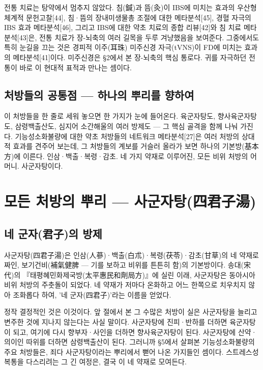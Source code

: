 \documentclass[12pt,oneside]{book}
\begin{document}
전통 치료는 탕약에서 멈추지 않았다. 침(鍼)과 뜸(灸)이 IBS에 미치는 효과의 우산형 체계적 문헌고찰[44], 침·뜸의 장내미생물총 조절에 대한 메타분석[45], 경혈 자극의 IBS 효과 메타분석[46], 그리고 IBS에 대한 약초 치료의 종합 리뷰[42]와 침 치료 메타분석[43]은, 전통 치료가 장-뇌축의 여러 길목을 두루 겨냥했음을 보여준다. 그중에서도 특히 눈길을 끄는 것은 경피적 이주(耳珠) 미주신경 자극(tVNS)이 FD에 미치는 효과의 메타분석[41]이다. 미주신경은 §2에서 본 장-뇌축의 핵심 통로다. 귀를 자극하던 전통이 바로 이 현대적 표적과 만나는 셈이다.

\subsection{처방들의 공통점 — 하나의 뿌리를 향하여}

이 처방들을 한 줄로 세워 놓으면 한 가지가 눈에 들어온다. 육군자탕도, 향사육군자탕도, 삼령백출산도, 심지어 소간해울의 여러 방제도 — 그 핵심 골격을 함께 나눠 가진다. 기능성소화불량에 대한 약초 처방들의 네트워크 메타분석[27]은 여러 처방의 상대적 효과를 견주어 보는데, 그 처방들의 계보를 거슬러 올라가 보면 하나의 기본방(基本方)에 이른다. 인삼·백출·복령·감초. 네 가지 약재로 이루어진, 모든 비위 처방의 어머니. 사군자탕이다.

\section{모든 처방의 뿌리 — 사군자탕(四君子湯)}

\subsection{네 군자(君子)의 방제}

사군자탕(四君子湯)은 인삼(人蔘)·백출(白朮)·복령(茯苓)·감초(甘草)의 네 약재로 짜인, 보기건비(補氣健脾 — 기를 보하고 비위를 튼튼히 함)의 기본방이다. 송대(宋代)의 『태평혜민화제국방(太平惠民和劑局方)』에 실린 이래, 사군자탕은 동아시아 비위 처방의 주춧돌이 되었다. 네 약재가 저마다 온화하고 어느 한쪽으로 치우치지 않아 조화롭다 하여, '네 군자(四君子)'라는 이름을 얻었다.

정작 결정적인 것은 이것이다. 앞 절에서 본 그 수많은 처방이 실은 사군자탕을 늘리고 변주한 것에 지나지 않는다는 사실 말이다. 사군자탕에 진피·반하를 더하면 육군자탕이 되고, 여기에 다시 향부자·사인을 더하면 향사육군자탕이 된다. 사군자탕에 산약·의이인 따위를 더하면 삼령백출산이 된다. 그러니까 §5에서 살펴본 기능성소화불량의 주요 처방들은, 죄다 사군자탕이라는 뿌리에서 뻗어 나온 가지들인 셈이다. 스트레스성 복통을 다스리려는 그 긴 여정은, 결국 이 네 약재로 모여든다.
\end{document}
